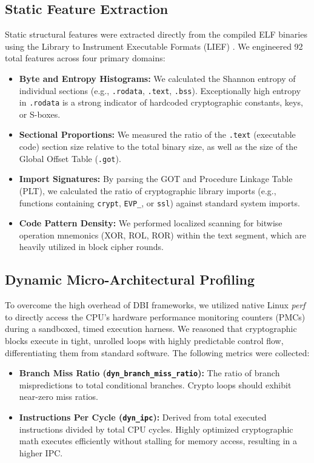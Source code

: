 \documentclass[conference]{IEEEtran}
\begin{document}
\subsection{Static Feature Extraction}
Static structural features were extracted directly from the compiled ELF binaries using the Library to Instrument Executable Formats (LIEF) \cite{lief}. We engineered 92 total features across four primary domains:
\begin{itemize}
    \item \textbf{Byte and Entropy Histograms:} We calculated the Shannon entropy of individual sections (e.g., \texttt{.rodata}, \texttt{.text}, \texttt{.bss}). Exceptionally high entropy in \texttt{.rodata} is a strong indicator of hardcoded cryptographic constants, keys, or S-boxes.
    \item \textbf{Sectional Proportions:} We measured the ratio of the \texttt{.text} (executable code) section size relative to the total binary size, as well as the size of the Global Offset Table (\texttt{.got}).
    \item \textbf{Import Signatures:} By parsing the GOT and Procedure Linkage Table (PLT), we calculated the ratio of cryptographic library imports (e.g., functions containing \texttt{crypt}, \texttt{EVP\_}, or \texttt{ssl}) against standard system imports.
    \item \textbf{Code Pattern Density:} We performed localized scanning for bitwise operation mnemonics (XOR, ROL, ROR) within the text segment, which are heavily utilized in block cipher rounds.
\end{itemize}

\subsection{Dynamic Micro-Architectural Profiling}
To overcome the high overhead of DBI frameworks, we utilized native Linux \textit{perf} to directly access the CPU's hardware performance monitoring counters (PMCs) during a sandboxed, timed execution harness. We reasoned that cryptographic blocks execute in tight, unrolled loops with highly predictable control flow, differentiating them from standard software. The following metrics were collected:
\begin{itemize}
    \item \textbf{Branch Miss Ratio (\texttt{dyn\_branch\_miss\_ratio}):} The ratio of branch mispredictions to total conditional branches. Crypto loops should exhibit near-zero miss ratios.
    \item \textbf{Instructions Per Cycle (\texttt{dyn\_ipc}):} Derived from total executed instructions divided by total CPU cycles. Highly optimized cryptographic math executes efficiently without stalling for memory access, resulting in a higher IPC.
\end{itemize}
\end{document}
